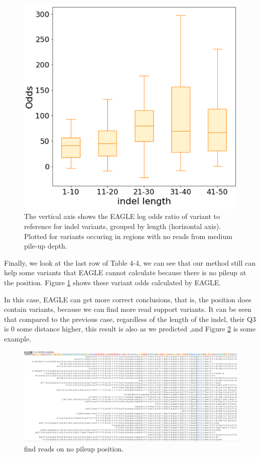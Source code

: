 \vspace{0.5cm}
\begin{figure}[H]
    \centering
    \includegraphics[width=0.6\columnwidth]{body/image/mid_new_odds.png}
    \captionsetup{labelfont=bf}
    \renewcommand{\baselinestretch}{1.0}
    \caption[no reads with variants from medium pile-up depth odds ratio]{The vertical axis shows the EAGLE log odds ratio of variant to reference for indel variants, grouped by length (horizontal axis).  Plotted for variants occuring in regions with no reads from medium pile-up depth.}
    \label{mid_new_odds}
\end{figure}


Finally, we look at the last row of Table 4-4, we can see that our method still can help some variants that EAGLE cannot calculate because there is no pileup at the position. Figure \ref{mid_new_odds} shows these variant odds calculated by EAGLE.

In this case, EAGLE can get more correct conclusions, that is, the position does contain variants, because we can find more read support variants. It can be seen that compared to the previous case, regardless of the length of the indel, their Q3 is 0 some distance higher, this result is also as we predicted ,and Figure \ref{mid_new_pileup} is some example.

\vspace{1cm}
\begin{figure}[H]
    \centering
    \includegraphics[width=1\columnwidth]{body/image/mid_new_pileup.png}
    \captionsetup{labelfont=bf}
    \renewcommand{\baselinestretch}{1.0}
    \vspace{-1cm}
    \caption[find new pileup reads in medium pile-up read depth]{find reads on no pileup position.}
    \label{mid_new_pileup}
\end{figure}

